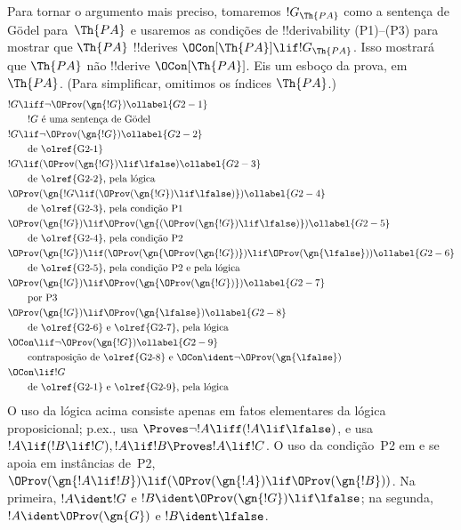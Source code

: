\documentclass[../../../include/open-logic-section]{subfiles}
\begin{document}
Para tornar o argumento mais preciso, tomaremos $!G_\Th{PA}$ como a
sentença de G\"odel para~$\Th{PA}$ e usaremos as condições de
!!{derivability} (P1)--(P3) para mostrar que $\Th{PA}$ !!{derive}s
$\OCon[\Th{PA}] \lif !G_\Th{PA}$. Isso mostrará que $\Th{PA}$ não
!!{derive} $\OCon[\Th{PA}]$. Eis um esboço da prova, em~$\Th{PA}$.
(Para simplificar, omitimos os índices $\Th{PA}$.)
\begin{align}
& !G \liff \lnot \OProv(\gn{!G}) \ollabel{G2-1}\\
& \qquad\text{$!G$ é uma sentença de G\"odel}\notag \\
& !G \lif \lnot \OProv(\gn{!G}) \ollabel{G2-2}\\
  & \qquad\text{de \olref{G2-1}} \notag\\
& !G \lif
  (\OProv(\gn{!G}) \lif \lfalse) \ollabel{G2-3}\\
  & \qquad\text{de \olref{G2-2}, pela lógica}\notag\\
& \OProv(\gn{
    !G \lif
    (\OProv(\gn{!G}) \lif \lfalse)
  }) \ollabel{G2-4}\\
  & \qquad\text{de \olref{G2-3}, pela condição P1} \notag\\
& \OProv(\gn{!G}) \lif
  \OProv(\gn{
    (\OProv(\gn{!G}) \lif \lfalse)
    }) \ollabel{G2-5}\\
  & \qquad\text{de \olref{G2-4}, pela condição P2} \notag\\
& \OProv(\gn{!G}) \lif (\OProv(\gn{\OProv(\gn{!G})}) \lif \OProv(\gn{\lfalse})) \ollabel{G2-6}\\
  & \qquad\text{de \olref{G2-5}, pela condição P2 e pela lógica} \notag\\
& \OProv(\gn{!G}) \lif 
  \OProv(\gn{\OProv(\gn{!G})}) \ollabel{G2-7}\\
   & \qquad\text{por P3} \notag\\
& \OProv(\gn{!G}) \lif \OProv(\gn{\lfalse}) \ollabel{G2-8}\\
  & \qquad \text{de \olref{G2-6} e \olref{G2-7}, pela lógica}\notag\\
& \OCon \lif \lnot \OProv(\gn{!G}) \ollabel{G2-9}\\
  & \qquad\text{contraposição de \olref{G2-8} e $\OCon \ident \lnot \OProv(\gn{\lfalse})$}\notag \\
& \OCon \lif !G \notag\\
  & \qquad\text{de \olref{G2-1} e \olref{G2-9}, pela lógica}\notag
\end{align}
O uso da lógica acima consiste apenas em fatos elementares da lógica
proposicional; p.ex.,  usa $\Proves \lnot!A \liff (!A\lif
\lfalse)$, e  usa $!A \lif (!B \lif !C), !A \lif !B
\Proves !A \lif !C$. O uso da condição~P2 em  e
 se apoia em instâncias de~P2,
$\OProv(\gn{!A \lif !B}) \lif
(\OProv(\gn{!A}) \lif \OProv(\gn{!B}))$. Na primeira, $!A \ident !G$ e
$!B \ident \OProv(\gn{!G}) \lif \lfalse$; na segunda, $!A \ident
\OProv(\gn{G})$ e $!B \ident \lfalse$.
\end{document}
